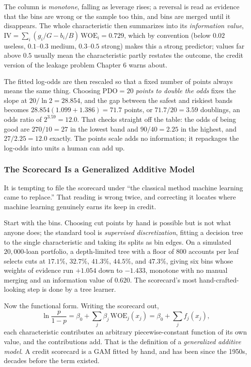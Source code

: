 \documentclass[../ai_in_finance]{subfiles}
\begin{document}
The column is \emph{monotone}, falling as leverage rises; a reversal is read as evidence that the bins are wrong or the sample too thin, and bins are merged until it disappears. The whole characteristic then summarizes into its \emph{information value}, $\text{IV} = \sum_i (g_i/G - b_i/B)\,\text{WOE}_i = 0.729$, which by convention (below $0.02$ useless, $0.1$--$0.3$ medium, $0.3$--$0.5$ strong) makes this a strong predictor; values far above $0.5$ usually mean the characteristic partly restates the outcome, the credit version of the leakage problem Chapter 6 warns about.

The fitted log-odds are then rescaled so that a fixed number of points always means the same thing. Choosing $\text{PDO}=20$ \emph{points to double the odds} fixes the slope at $20/\ln 2 = 28.854$, and the gap between the safest and riskiest bands becomes $28.854(1.099+1.386) = 71.7$ points, or $71.7/20 = 3.59$ doublings, an odds ratio of $2^{3.59}=12.0$. That checks straight off the table: the odds of being good are $270/10 = 27$ in the lowest band and $90/40 = 2.25$ in the highest, and $27/2.25 = 12.0$ exactly. The points scale adds no information; it repackages the log-odds into units a human can add up.

\subsubsection*{The Scorecard Is a Generalized Additive Model}
\label{sec:gam-connection}

It is tempting to file the scorecard under ``the classical method machine learning came to replace.'' That reading is wrong twice, and correcting it locates where machine learning genuinely earns its keep in credit.

Start with the bins. Choosing cut points by hand is possible but is not what anyone does; the standard tool is \emph{supervised discretization}, fitting a decision tree to the single characteristic and taking its splits as bin edges. On a simulated $20{,}000$-loan portfolio, a depth-limited tree with a floor of $800$ accounts per leaf selects cuts at $17.1\%$, $32.7\%$, $41.3\%$, $44.5\%$, and $47.3\%$, giving six bins whose weights of evidence run $+1.054$ down to $-1.433$, monotone with no manual merging and an information value of $0.620$. The scorecard's most hand-crafted-looking step is done by a tree learner.

Now the functional form. Writing the scorecard out,
\begin{equation*}
\ln\frac{p}{1-p} = \beta_0 + \sum_j \beta_j\,\text{WOE}_j(x_j) = \beta_0 + \sum_j f_j(x_j),
\end{equation*}
each characteristic contributes an arbitrary piecewise-constant function of its own value, and the contributions add. That is the definition of a \emph{generalized additive model}. A credit scorecard is a GAM fitted by hand, and has been since the 1950s, decades before the term existed.
\end{document}
